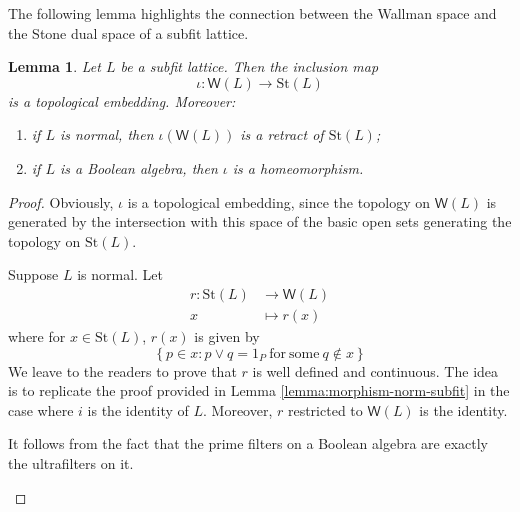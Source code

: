 \documentclass{article}
\theoremstyle{plain}
\newtheorem{lemma}[theorem]{Lemma}
\theoremstyle{definition}
\theoremstyle{remark}
\newcommand{\bp}[1]{\left\lbrace #1 \right\rbrace}
\newcommand{\0}{\mathbbm 0}
\newcommand{\1}{\mathbbm 1}
\newcommand{\2}{\mathbbm 2}
\begin{document}
The following lemma highlights the connection between the Wallman space and the  Stone dual space of a subfit lattice.


\begin{lemma}
\label{lemma:stonedual-subfit}
   Let $L$ be a subfit lattice. Then the inclusion map 
\[ 
   \iota: \mathsf{W}(L) \to \mathrm{St}(L)
   \] 
   is a topological embedding.
Moreover: 
   \begin{enumerate}
       \item \label{lemma:stonedual-subfit-1} if $L$ is normal, then $\iota(\mathsf{W}(L))$ is a retract of  $ \mathrm{St}(L)$;
       \item \label{lemma:stonedual-subfit-2} if $L$ is a Boolean algebra, then $\iota$ is a homeomorphism.
   \end{enumerate}
\end{lemma}
\begin{proof}
Obviously, $\iota$ is a topological embedding, since the topology on $\mathsf{W}(L)$ is generated by the intersection with this space of the basic open sets generating the topology on $\mathrm{St}(L)$. 
\begin{description}[font=\normalfont \itshape]
    \item[\ref{lemma:stonedual-subfit-1}.] Suppose $L$ is normal. Let \begin{align*}
        r:  \mathrm{St}(L) &\to \mathsf{W}(L)\\
x &\mapsto r(x)   
    \end{align*}
    where for $x\in \mathrm{St}(L)$, $r(x)$ is given by
\[
    \bp{p \in x: p \vee q =1_P \mathrm{\ for \ some \ } q \notin x } 
    \]
    We leave to the readers to prove that \( r\) is well defined and continuous. The idea is to replicate the proof provided in Lemma \ref{lemma:morphism-norm-subfit} in the  case where \( i \) is the identity of $L$. Moreover, $r$ restricted to $\mathsf{W}(L)$ is the identity. 
    \item[\ref{lemma:stonedual-subfit-2}.] It follows from the fact that the prime filters on a Boolean algebra are exactly the ultrafilters on it. 
\end{description}
\end{proof}
\end{document}
